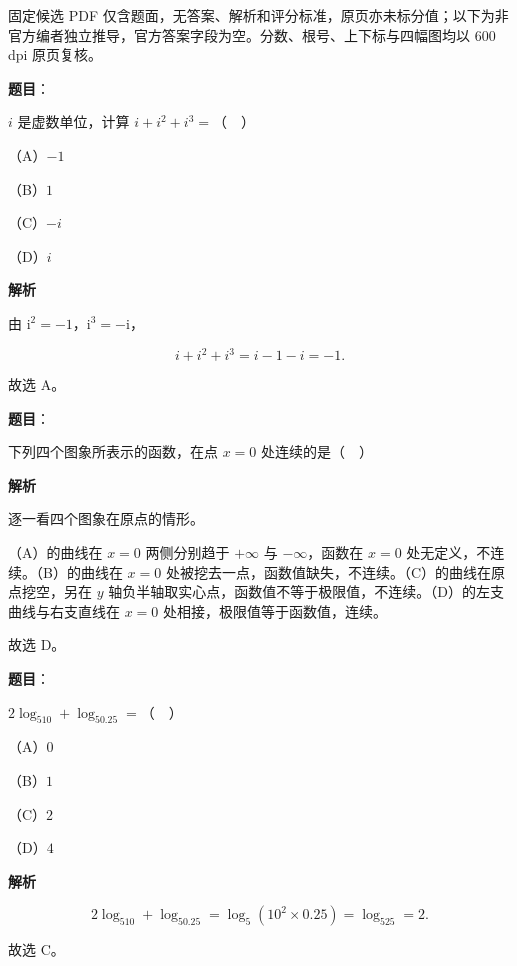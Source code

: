 

\begin{gktip}
固定候选 PDF 仅含题面，无答案、解析和评分标准，原页亦未标分值；以下为非官方编者独立推导，官方答案字段为空。分数、根号、上下标与四幅图均以 600 dpi 原页复核。
\end{gktip}

\begin{answer}

\textbf{题目}：

$i$ 是虚数单位，计算 $i+i^2+i^3=$（　）

（A）$-1$

（B）$1$

（C）$-i$

（D）$i$

\textbf{解析}

由 $\mathrm i^2=-1$，$\mathrm i^3=-\mathrm i$，

\nopagebreak[4]
\[i+i^2+i^3=i-1-i=-1.\]

故选 A。


\end{answer}
\begin{answer}

\textbf{题目}：

下列四个图象所表示的函数，在点 $x=0$ 处连续的是（　）
\nopagebreak[4]
\begin{center}\end{center}
\nopagebreak[4]
\textbf{解析}

逐一看四个图象在原点的情形。

（A）的曲线在 $x=0$ 两侧分别趋于 $+\infty$ 与 $-\infty$，函数在 $x=0$ 处无定义，不连续。（B）的曲线在 $x=0$ 处被挖去一点，函数值缺失，不连续。（C）的曲线在原点挖空，另在 $y$ 轴负半轴取实心点，函数值不等于极限值，不连续。（D）的左支曲线与右支直线在 $x=0$ 处相接，极限值等于函数值，连续。

故选 D。


\end{answer}
\begin{answer}

\textbf{题目}：

$2\log_510+\log_50.25=$（　）

（A）$0$

（B）$1$

（C）$2$

（D）$4$

\textbf{解析}

\nopagebreak[4]
\[2\log_510+\log_50.25=\log_5\left(10^2\times0.25\right)=\log_525=2.\]

故选 C。


\end{answer}
